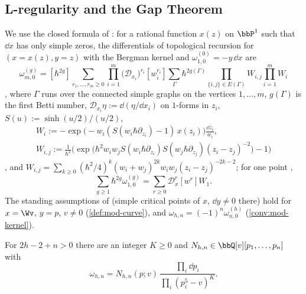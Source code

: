 \subsection{L-regularity and the Gap Theorem}
\label{sec:mod-Lreg}

We use the closed formula of \cite[Thm.~7.1]{ABDKS25}: for a rational function $x(z)$ on $\bbP^1$ such that $\dd x$ has only simple zeros, the differentials of topological recursion for $(x=x(z),y=z)$ with the Bergman kernel and $\omega^{(0)}_{1,0}=-y\,\dd x$ are
\begin{equation}
\label{eq:mod-abdks}
\omega^{(g)}_{m,0}=[\hbar^{2g}]\sum_{r_1,\dots,r_m\geq 0}\prod_{i=1}^m\big(\mathcal D_{x_i}\big)^{r_i}[w_i^{r_i}]\sum_{\Gamma}\hbar^{2g(\Gamma)}\prod_{\{i,j\}\in E(\Gamma)}W_{i,j}\prod_{i=1}^mW_i
\end{equation}
\cite[(7.9)]{ABDKS25}, where $\Gamma$ runs over the connected simple graphs on the vertices $1,\dots,m$, $g(\Gamma)$ is the first Betti number, $\mathcal D_{x_i}\eta:=\dd(\eta/\dd x_i)$ on $1$-forms in $z_i$, $S(u):=\sinh(u/2)/(u/2)$,
\begin{gather*}
W_i:=-\exp\!\big(-w_i(S(w_i\hbar\partial_{z_i})-1)\,x(z_i)\big)\frac{\dd z_i}{w_i},\\
W_{i,j}:=\frac{1}{\hbar^2}\Big(\exp\!\big(\hbar^2w_iw_jS(w_i\hbar\partial_{z_i})S(w_j\hbar\partial_{z_j})(z_i-z_j)^{-2}\big)-1\Big)
\end{gather*}
\cite[(7.6), (7.7)]{ABDKS25}, and $W_{i,j}=\sum_{k\geq 0}(\hbar^2/4)^k(w_i+w_j)^{2k}w_iw_j(z_i-z_j)^{-2k-2}$; for one point \cite[(7.10)]{ABDKS25},
\begin{equation}
\label{eq:mod-710}
\sum_{g\geq 1}\hbar^{2g}\omega^{(g)}_{1,0}=\sum_{r\geq 0}\mathcal D_x^r[w^r]W_1 .
\end{equation}
The standing assumptions of \cite[\S1.1]{ABDKS25} (simple critical points of $x$, $\dd y\neq 0$ there) hold for $x=\Wv$, $y=p$, $v\neq 0$ (\cref{def:mod-curve}), and $\omega_{h,n}=(-1)^n\omega^{(h)}_{n,0}$ (\cref{conv:mod-kernel}).

\begin{lem}
\label{lem:mod-abdks}
For $2h-2+n>0$ there are an integer $K\geq 0$ and $N_{h,n}\in\bbQ[v][p_1,\dots,p_n]$ with
\[
\omega_{h,n}=N_{h,n}(p;v)\,\frac{\prod_i\dd p_i}{\prod_i(p_i^5-v)^K}.
\]
\end{lem}

